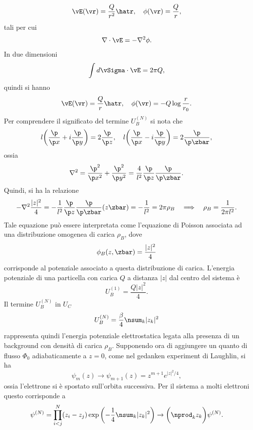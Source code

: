 \begin{equation}
    \vE(\vr) = \frac{Q}{r^2}\hatr,\quad \phi(\vr) = \frac{Q}{r},
\end{equation}
tali per cui 
\begin{equation}
    \nabla \cdot \vE = -\nabla^2\phi.
\end{equation}
In due dimensioni 
\begin{equation}
    \int d\vSigma \cdot \vE = 2\pi Q,
\end{equation}
quindi si hanno 
\begin{equation}
    \vE(\vr) = \frac{Q}{r}\hatr,\quad \phi(\vr) = -Q\log{\frac{r}{r_0}}.
\end{equation}
Per comprendere il significato del termine $U_B^{(N)}$ si nota che 
\begin{equation}
    l\bigg(\frac{\p}{\p x} + i\frac{\p}{\p y}\bigg) = 2\frac{\p}{\p z},\quad l\bigg(\frac{\p}{\p x} - i\frac{\p}{\p y}\bigg) = 2\frac{\p}{\p \zbar},
\end{equation}
ossia
\begin{equation}
    \nabla^2 = \frac{\p^2}{\p x^2} + \frac{\p^2}{\p y^2} = \frac{4}{l^2}\frac{\p}{\p z}\frac{\p}{\p \zbar}.
\end{equation}
Quindi, si ha la relazione
\begin{equation}
    -\nabla^2 \frac{|z|^2}{4} = -\frac{1}{l^2}\frac{\p}{\p z}\frac{\p}{\p \zbar}(z\zbar) = -\frac{1}{l^2} = 2\pi\rho_B\quad\Longrightarrow\quad \rho_B = \frac{1}{2\pi l^2}.
\end{equation}
Tale equazione può essere interpretata come l'equazione di Poisson associata ad una distribuzione omogenea di carica $\rho_B$, dove
\begin{equation}
    \phi_B(z,\zbar) = \frac{|z|^2}{4}
\end{equation}
corrisponde al potenziale associato a questa distribuzione di carica. L'energia potenziale di una particella con carica $Q$ a distanza $|z|$ dal centro del sistema è
\begin{equation}
    U_B^{(1)} = \frac{Q|z|^2}{4}.
\end{equation}
Il termine $U^{(N)}_B$ in $U_C$ 
\begin{equation}
    U_B^{(N)} = \frac{\beta}{4}\nsum_k|z_k|^2
\end{equation}
rappresenta quindi l'energia potenziale elettrostatica legata alla presenza di un background con densità di carica $\rho_B$. Supponendo ora di aggiungere un quanto di flusso $\Phi_0$ adiabaticamente a $z = 0$, come nel gedanken experiment di Laughlin, si ha
\begin{equation}
    \psi_m(z) \to \psi_{m + 1}(z) = z^{m + 1}e^{|z|^2/4},
\end{equation}
ossia l'elettrone si è spostato sull'orbita successiva. Per il sistema a molti elettroni questo corrisponde a
\begin{equation}
    \psi^{(N)} = \prod_{i < j}^N(z_i - z_j)\exp{\bigg({-\frac{1}{4}\nsum_k|z_k|^2}\bigg)} \to \bigg(\nprod_kz_k\bigg)\psi^{(N)}.
\end{equation}

